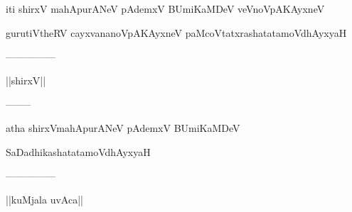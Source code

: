 \documentclass{article}
\begin{document}
\begin{center}
iti shirxV mahApurANeV pAdemxV BUmiKaMDeV veVnoVpAKAyxneV
\end{center}

\begin{center}
gurutiVtheRV cayxvananoVpAKAyxneV paMcoVtatxrashatatamoVdhAyxyaH
\end{center}

\begin{center}
---------------
\end{center}

\begin{center}
||shirxV||
\end{center}

\begin{center}
--------
\end{center}

\begin{center}
atha shirxVmahApurANeV pAdemxV BUmiKaMDeV
\end{center}

\begin{center}
SaDadhikashatatamoVdhAyxyaH
\end{center}

\begin{center}
---------------
\end{center}

\begin{center}
||kuMjala uvAca||
\end{center}
\end{document}
